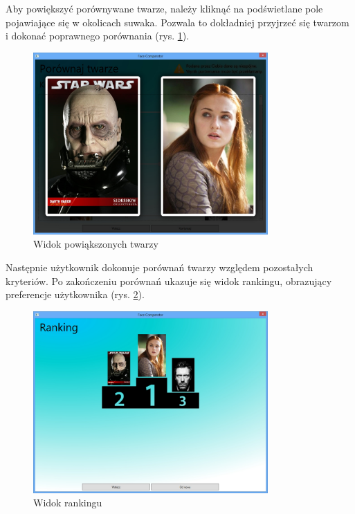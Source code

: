 \documentclass[a4paper,notitlepage]{article}
\begin{document}
Aby powiększyć porównywane twarze, należy kliknąć na podświetlane pole pojawiające się w okolicach suwaka.
Pozwala to dokładniej przyjrzeć się twarzom i dokonać poprawnego porównania (rys. \ref{img_big_faces}).
	\begin{figure}[!htp]
	\centering
	\caption{Widok powiąkszonych twarzy}
	\label{img_big_faces}
	\includegraphics[width=0.8\textwidth]{img/bigFaces}
	\end{figure}

Następnie użytkownik dokonuje porównań twarzy względem pozostałych kryteriów.
Po zakończeniu porównań ukazuje się widok rankingu, obrazujący preferencje użytkownika (rys. \ref{img_ranking}).
	\begin{figure}[!htp]
	\centering
	\caption{Widok rankingu}
	\label{img_ranking}
	\includegraphics[width=0.8\textwidth]{img/ranking}
	\end{figure}
\end{document}
